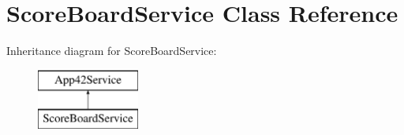 \hypertarget{class_score_board_service}{\section{Score\+Board\+Service Class Reference}
\label{class_score_board_service}
}
Inheritance diagram for Score\+Board\+Service\+:\begin{figure}[H]
\begin{center}
\leavevmode
\includegraphics[height=2.000000cm]{class_score_board_service}
\end{center}
\end{figure}
